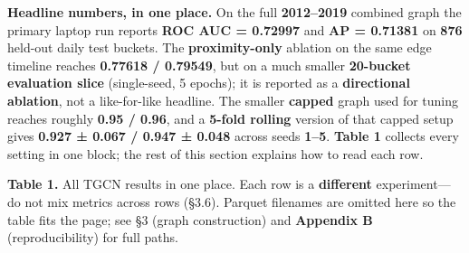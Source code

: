 \documentclass[
]{article}
\begin{document}
\textbf{Headline numbers, in one place.} On the full \textbf{2012--2019}
combined graph the primary laptop run reports \textbf{ROC AUC = 0.72997}
and \textbf{AP = 0.71381} on \textbf{876} held-out daily test buckets.
The \textbf{proximity-only} ablation on the same edge timeline reaches
\textbf{0.77618 / 0.79549}, but on a much smaller \textbf{20-bucket
evaluation slice} (single-seed, 5 epochs); it is reported as a
\textbf{directional ablation}, not a like-for-like headline. The smaller
\textbf{capped} graph used for tuning reaches roughly \textbf{0.95 /
0.96}, and a \textbf{5-fold rolling} version of that capped setup gives
\textbf{0.927 ± 0.067 / 0.947 ± 0.048} across seeds \textbf{1--5}.
\textbf{Table 1} collects every setting in one block; the rest of this
section explains how to read each row.

\textbf{Table 1.} All TGCN results in one place. Each row is a
\textbf{different} experiment---do not mix metrics across rows (§3.6).
Parquet filenames are omitted here so the table fits the page; see §3
(graph construction) and \textbf{Appendix B} (reproducibility) for full
paths.
\end{document}
